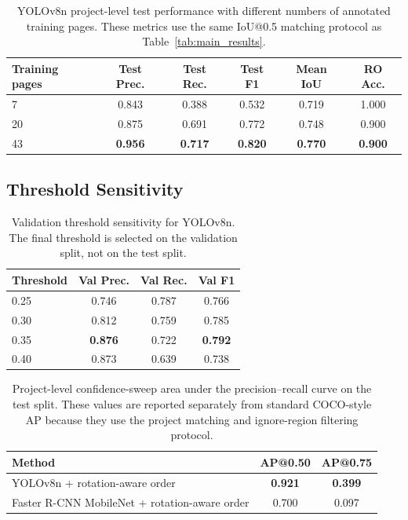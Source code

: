 \documentclass[pdflatex,sn-mathphys-num]{sn-jnl}
\begin{document}
\begin{table}[t]
\centering
\scriptsize\setlength{\tabcolsep}{3pt}
\caption{YOLOv8n project-level test performance with different numbers of annotated training pages. These metrics use the same IoU@0.5 matching protocol as Table~\ref{tab:main_results}.}
\label{tab:train_size}
\begin{tabular}{lccccc}
\toprule
Training pages & Test Prec. & Test Rec. & Test F1 & Mean IoU & RO Acc. \\
\midrule
7 & 0.843 & 0.388 & 0.532 & 0.719 & 1.000 \\
20 & 0.875 & 0.691 & 0.772 & 0.748 & 0.900 \\
43 & \textbf{0.956} & \textbf{0.717} & \textbf{0.820} & \textbf{0.770} & \textbf{0.900} \\
\bottomrule
\end{tabular}
\end{table}

\subsection{Threshold Sensitivity}
\begin{table}[t]
\centering
\scriptsize\setlength{\tabcolsep}{3pt}
\caption{Validation threshold sensitivity for YOLOv8n. The final threshold is selected on the validation split, not on the test split.}
\label{tab:threshold}
\begin{tabular}{lccc}
\toprule
Threshold & Val Prec. & Val Rec. & Val F1 \\
\midrule
0.25 & 0.746 & 0.787 & 0.766 \\
0.30 & 0.812 & 0.759 & 0.785 \\
0.35 & \textbf{0.876} & 0.722 & \textbf{0.792} \\
0.40 & 0.873 & 0.639 & 0.738 \\
\bottomrule
\end{tabular}
\end{table}


\begin{table}[t]
\centering
\scriptsize\setlength{\tabcolsep}{3pt}
\caption{Project-level confidence-sweep area under the precision--recall curve on the test split. These values are reported separately from standard COCO-style AP because they use the project matching and ignore-region filtering protocol.}
\label{tab:project_ap}
\begin{tabular}{lcc}
\toprule
Method & AP@0.50 & AP@0.75 \\
\midrule
YOLOv8n + rotation-aware order & \textbf{0.921} & \textbf{0.399} \\
Faster R-CNN MobileNet + rotation-aware order & 0.700 & 0.097 \\
\bottomrule
\end{tabular}
\end{table}
\end{document}
